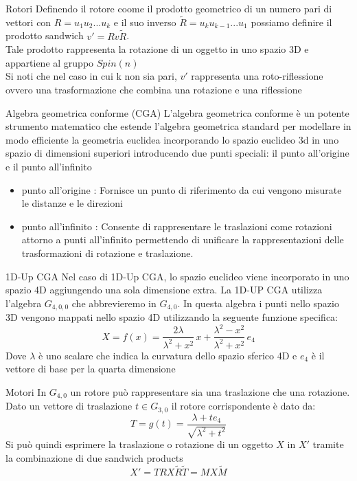 \begin{frame}{Rotori}
   Definendo il rotore coome il prodotto geometrico di un numero pari di vettori con \(R=u_1u_2...u_k\) e il suo inverso  \(\tilde{R} = u_ku_{k-1}...u_1\) possiamo definire il prodotto sandwich \(v'=Rv\tilde{R}\). 
   \\Tale prodotto rappresenta la rotazione di un oggetto in uno spazio 3D e appartiene al gruppo \(Spin(n)\)
   \\Si noti che nel caso in cui k non sia pari, \(v'\) rappresenta una roto-riflessione ovvero una trasformazione che combina una rotazione e una riflessione
\end{frame}

\begin{frame}{Algebra geometrica conforme (CGA)}
   L’algebra geometrica conforme è un potente strumento matematico che estende l’algebra geometrica standard per modellare in modo efficiente la geometria euclidea incorporando lo spazio euclideo 3d in uno spazio di dimensioni superiori introducendo due punti speciali: il punto all’origine e il punto all’infinito
   \begin{itemize}
      \item punto all’origine : Fornisce un punto di riferimento da cui vengono misurate le distanze e le direzioni 
      \item punto all’infinito : Consente di rappresentare le traslazioni come rotazioni attorno a punti all’infinito permettendo di unificare la rappresentazioni delle trasformazioni di rotazione e traslazione.
   \end{itemize}
\end{frame}

\begin{frame}{1D-Up CGA}
   Nel caso di 1D-Up CGA, lo spazio euclideo viene incorporato in uno spazio 4D aggiungendo una sola dimensione extra.
   La 1D-UP CGA utilizza l’algebra \(G_{4,0,0}\) che abbrevieremo in \(G_{4,0}\). In questa algebra i punti nello spazio 3D vengono mappati nello spazio 4D utilizzando la seguente funzione specifica:
   \begin{equation}
      X = f(x) = \frac{2\lambda}{\lambda^2 + x^2} \, x + \frac{\lambda^2 - x^2}{\lambda^2 + x^2} \, e_4
   \end{equation}
   Dove \(\lambda \) è uno scalare che indica la curvatura dello spazio sferico 4D e \(e_4\) è il vettore di base per la quarta dimensione 
\end{frame}

\begin{frame}{Motori}
   In \(G_{4,0}\) un rotore può rappresentare sia una traslazione che una rotazione. \\Dato un vettore di traslazione \(t \in G_{3,0}\) il rotore corrispondente è dato da: 
   \[
      T = g(t) = \frac{\lambda + t e_4}{\sqrt{\lambda^2 + t^2}}
   \]
   Si può quindi esprimere la traslazione o rotazione di un oggetto \(X\) in \(X'\) tramite la combinazione di due sandwich products
   \begin{equation}
      X'=TRX\tilde{R}\tilde{T} = MX\tilde{M}
   \end{equation}
\end{frame}

